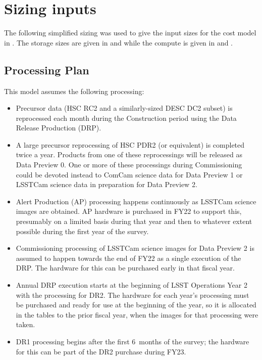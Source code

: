 \section{Sizing inputs} \label{sec:sizeinputs}

The following simplified sizing was used to give the input sizes for the cost model in .
The storage sizes are given in  and  while the compute is given in  and .

\subsection{Processing Plan}

This model assumes the following processing:
\begin{itemize}
\item Precursor data (HSC RC2 and a similarly-sized DESC DC2 subset) is reprocessed each month during the Construction period using the Data Release Production (DRP).
\item A large precursor reprocessing of HSC PDR2 (or equivalent) is completed twice a year.
Products from one of these reprocessings will be released as Data Preview 0.
One or more of these processings during Commissioning could be devoted instead to ComCam science data for Data Preview 1 or LSSTCam science data in preparation for Data Preview 2.
\item Alert Production (AP) processing happens continuously as LSSTCam science images are obtained.
AP hardware is purchased in FY22 to support this, presumably on a limited basis during that year and then to whatever extent possible during the first year of the survey.
\item Commissioning processing of LSSTCam science images for Data Preview 2 is assumed to happen towards the end of FY22 as a single execution of the DRP.
The hardware for this can be purchased early in that fiscal year.
\item Annual DRP execution starts at the beginning of LSST Operations Year 2 with the processing for DR2.
The hardware for each year's processing must be purchased and ready for use at the beginning of the year, so it is allocated in the tables to the prior fiscal year, when the images for that processing were taken.
\item DR1 processing begins after the first 6~months of the survey; the hardware for this can be part of the DR2 purchase during FY23.
\end{itemize}

